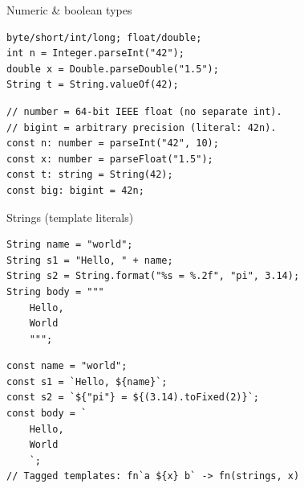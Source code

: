\documentclass[10pt]{article}
\begin{document}
\begin{construct}{Numeric \& boolean types}
\noindent
\begin{minipage}[t]{0.485\linewidth}
\begin{lstlisting}[style=java, title=Java]
byte/short/int/long; float/double;
int n = Integer.parseInt("42");
double x = Double.parseDouble("1.5");
String t = String.valueOf(42);
\end{lstlisting}
\end{minipage}\hfill
\begin{minipage}[t]{0.485\linewidth}
\begin{lstlisting}[style=ts, title=TypeScript]
// number = 64-bit IEEE float (no separate int).
// bigint = arbitrary precision (literal: 42n).
const n: number = parseInt("42", 10);
const x: number = parseFloat("1.5");
const t: string = String(42);
const big: bigint = 42n;
\end{lstlisting}
\end{minipage}
\end{construct}

\begin{construct}{Strings (template literals)}
\noindent
\begin{minipage}[t]{0.485\linewidth}
\begin{lstlisting}[style=java, title=Java]
String name = "world";
String s1 = "Hello, " + name;
String s2 = String.format("%s = %.2f", "pi", 3.14);
String body = """
    Hello,
    World
    """;
\end{lstlisting}
\end{minipage}\hfill
\begin{minipage}[t]{0.485\linewidth}
\begin{lstlisting}[style=ts, title=TypeScript]
const name = "world";
const s1 = `Hello, ${name}`;
const s2 = `${"pi"} = ${(3.14).toFixed(2)}`;
const body = `
    Hello,
    World
    `;
// Tagged templates: fn`a ${x} b` -> fn(strings, x)
\end{lstlisting}
\end{minipage}
\end{construct}

\end{document}
